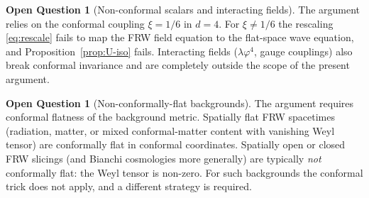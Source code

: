 \documentclass[11pt]{article}
\theoremstyle{definition}
\newtheorem{question}[theorem]{Open Question}
\begin{document}
\begin{question}[Non-conformal scalars and interacting fields]
The argument relies on the conformal coupling $\xi=1/6$ in $d=4$. For $\xi\neq 1/6$ the rescaling \eqref{eq:rescale} fails to map the FRW field equation to the flat-space wave equation, and Proposition~\ref{prop:U-iso} fails. Interacting fields ($\lambda\varphi^4$, gauge couplings) also break conformal invariance and are completely outside the scope of the present argument.
\end{question}

\begin{question}[Non-conformally-flat backgrounds]
The argument requires conformal flatness of the background metric. Spatially flat FRW spacetimes (radiation, matter, or mixed conformal-matter content with vanishing Weyl tensor) are conformally flat in conformal coordinates. Spatially open or closed FRW slicings (and Bianchi cosmologies more generally) are typically \emph{not} conformally flat: the Weyl tensor is non-zero. For such backgrounds the conformal trick does not apply, and a different strategy is required.
\end{question}
\end{document}
